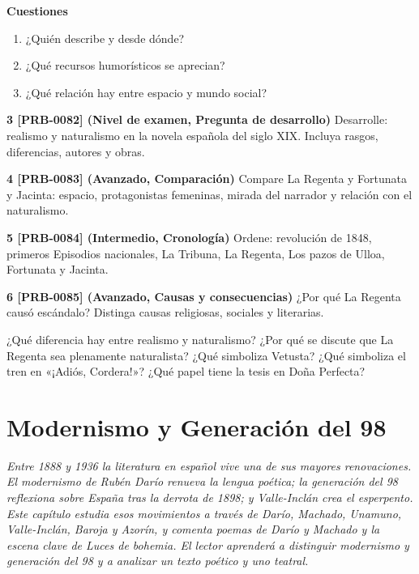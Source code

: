 \documentclass{book}
\begin{document}
\begin{tcolorbox}[title={Ejercicios}, studiumworked, breakable]
\noindent\textbf{Cuestiones}
\begin{enumerate}
\item ¿Quién describe y desde dónde?
\item ¿Qué recursos humorísticos se aprecian?
\item ¿Qué relación hay entre espacio y mundo social?
\end{enumerate}

\noindent\textbf{3 [PRB-0082] (Nivel de examen, Pregunta de desarrollo)}
Desarrolle: realismo y naturalismo en la novela española del siglo XIX. Incluya rasgos, diferencias, autores y obras.


\noindent\textbf{4 [PRB-0083] (Avanzado, Comparación)}
Compare La Regenta y Fortunata y Jacinta: espacio, protagonistas femeninas, mirada del narrador y relación con el naturalismo.


\noindent\textbf{5 [PRB-0084] (Intermedio, Cronología)}
Ordene: revolución de 1848, primeros Episodios nacionales, La Tribuna, La Regenta, Los pazos de Ulloa, Fortunata y Jacinta.


\noindent\textbf{6 [PRB-0085] (Avanzado, Causas y consecuencias)}
¿Por qué La Regenta causó escándalo? Distinga causas religiosas, sociales y literarias.

\end{tcolorbox}

\begin{tcolorbox}[title={Autoficha}, studiumcheck, breakable]

¿Qué diferencia hay entre realismo y naturalismo? ¿Por qué se discute que La Regenta sea plenamente naturalista? ¿Qué simboliza Vetusta? ¿Qué simboliza el tren en «¡Adiós, Cordera!»? ¿Qué papel tiene la tesis en Doña Perfecta?

\end{tcolorbox}

\chapter{Modernismo y Generación del 98}
\label{chap:lit-11}

\noindent\textit{Entre 1888 y 1936 la literatura en español vive una de sus mayores renovaciones. El modernismo de Rubén Darío renueva la lengua poética; la generación del 98 reflexiona sobre España tras la derrota de 1898; y Valle-Inclán crea el esperpento. Este capítulo estudia esos movimientos a través de Darío, Machado, Unamuno, Valle-Inclán, Baroja y Azorín, y comenta poemas de Darío y Machado y la escena clave de Luces de bohemia. El lector aprenderá a distinguir modernismo y generación del 98 y a analizar un texto poético y uno teatral.}
\end{document}
